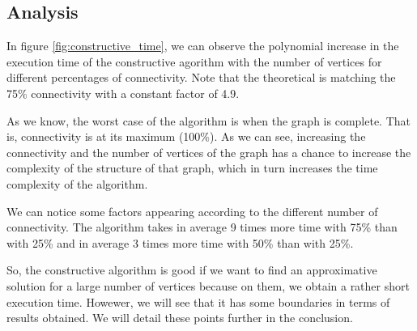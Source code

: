 
\subsection{Analysis}

In figure \ref{fig:constructive_time}, we can observe the polynomial increase in the execution time of the constructive agorithm with the number of vertices for different percentages of connectivity. Note that the theoretical is matching the 75\% connectivity with a constant factor of 4.9.
\bigskip

As we know, the worst case of the algorithm is when the graph is complete. That is, connectivity is at its maximum (100\%). As we can see, increasing the connectivity and the number of vertices of the graph has a chance to increase the complexity of the structure of that graph, which in turn increases the time complexity of the algorithm. 
\newpage

We can notice some factors appearing according to the different number of connectivity. The algorithm takes in average 9 times more time with 75\% than with 25\% and in average 3 times more time with 50\% than with 25\%.
\bigskip

So, the constructive algorithm is good if we want to find an approximative solution for a large number of vertices because on them, we obtain a rather short execution time. Howewer, we will see that it has some boundaries in terms of results obtained. We will detail these points further in the conclusion.